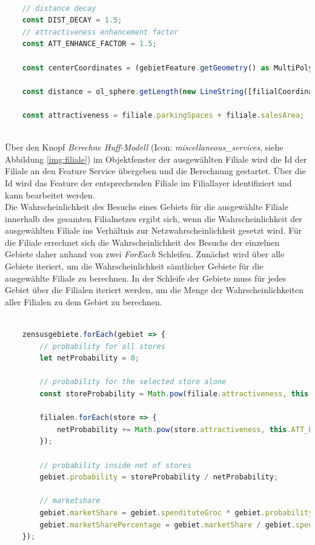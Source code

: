 \begin{lstlisting}[language=JavaScript, caption={Huff-Modell Variablen und Parameter}]
	
	// distance decay
	const DIST_DECAY = 1.5;
	// attractiveness enhancement factor
	const ATT_ENHANCE_FACTOR = 1.5;
	
	const centerCoordinates = (gebietFeature.getGeometry() as MultiPolygon).getInteriorPoints().getFirstCoordinate();
	
	const distance = ol_sphere.getLength(new LineString([filialCoordinates, centerCoordinates]), {projection: 'EPSG:3857'});
	
	const attractiveness = filiale.parkingSpaces + filiale.salesArea;
	
\end{lstlisting}

Über den Knopf \emph{Berechne Huff-Modell} (Icon: \emph{miscellaneous\_services}, siehe Abbildung \ref{img:filiale}) im Objektfenster der ausgewählten Filiale wird die Id der Filiale an den Feature Service übergeben und die Berechnung gestartet.
Über die Id wird das Feature der entsprechenden Filiale im Filiallayer identifiziert und kann bearbeitet werden.\\
Die Wahrscheinlichkeit des Besuchs eines Gebiets für die ausgewählte Filiale innerhalb des gesamten Filialnetzes ergibt sich, wenn die Wahrscheinlichkeit der ausgewählten Filiale ins Verhältnis zur Netzwahrscheinlichkeit gesetzt wird.
Für die Filiale errechnet sich die Wahrscheinlichkeit des Besuchs der einzelnen Gebiete daher anhand von zwei \emph{ForEach} Schleifen.
Zunächst wird über alle Gebiete iteriert, um die Wahrscheinlichkeit sämtlicher Gebiete für die ausgewählte Filiale zu berechnen.
In der Schleife der Gebiete muss für jedes Gebiet über die Filialen iteriert werden, um die Menge der Wahrscheinlichkeiten aller Filialen zu dem Gebiet zu berechnen.

\begin{lstlisting}[language=JavaScript, caption={Berechnung des Huff-Modells}]
	
	zensusgebiete.forEach(gebiet => {
		// probability for all stores
		let netProbability = 0;
		
		// probability for the selected store alone
		const storeProbability = Math.pow(filiale.attractiveness, this.ATT_ENHANCE_FACTOR) / Math.pow(distance, this.DIST_DECAY);
		
		filialen.forEach(store => {
			netProbability += Math.pow(store.attractiveness, this.ATT_ENHANCE_FACTOR) / Math.pow(this.calculateDistancesForFiliale(store.coordinates, gebiet.coordinates), this.DIST_DECAY);
		});
	
		// probability inside net of stores
		gebiet.probability = storeProbability / netProbability;

		// marketshare
		gebiet.marketShare = gebiet.spendituteGroc * gebiet.probability;
		gebiet.marketSharePercentage = gebiet.marketShare / gebiet.spendituteGroc;
	});
\end{lstlisting}

